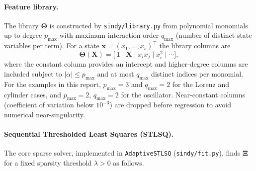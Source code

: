 \documentclass[12pt]{article}
\begin{document}
\paragraph{Feature library.}
The library $\boldsymbol{\Theta}$ is constructed by \texttt{sindy/library.py}
from polynomial monomials up to degree $p_{\max}$ with maximum interaction
order $q_{\max}$ (number of distinct state variables per term).  For a state
$\mathbf{x} = (x_{1}, \ldots, x_{s})^{\top}$ the library columns are
\begin{equation}
  \boldsymbol{\Theta}(\mathbf{X}) =
  \bigl[\,\mathbf{1} \;\big|\; \mathbf{X} \;\big|\;
  x_{i}x_{j} \;\big|\; x_{i}^{2} \;\big|\; \cdots \bigr],
  \label{eq:library}
\end{equation}
where the constant column provides an intercept and higher-degree columns
are included subject to $|\alpha| \leq p_{\max}$ and at most $q_{\max}$
distinct indices per monomial.  For the examples in this report,
$p_{\max} = 3$ and $q_{\max} = 2$ for the Lorenz and cylinder cases,
and $p_{\max} = 2$, $q_{\max} = 2$ for the oscillator.
Near-constant columns (coefficient of variation below $10^{-3}$) are
dropped before regression to avoid numerical near-singularity.

\paragraph{Sequential Thresholded Least Squares (STLSQ).}
The core sparse solver, implemented in \texttt{AdaptiveSTLSQ}
(\texttt{sindy/fit.py}), finds $\boldsymbol{\Xi}$ for a fixed sparsity
threshold $\lambda > 0$ as follows.
\end{document}
